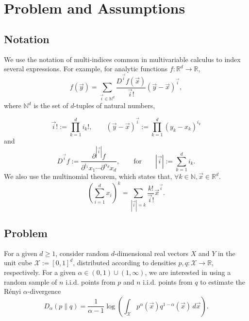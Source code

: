 \documentclass{article}
\newcommand{\N}{\mathbb{N}}                         %
\newcommand{\R}{\mathbb{R}}                         %
\newcommand{\X}{\mathcal{X}}                        %
\newcommand{\vx}{\vec{x}}                           %
\newcommand{\vy}{\vec{y}}                           %
\newcommand{\vi}{{\vec{i}}}                         %
\begin{document}



\section{Problem and Assumptions} \label{sec:Problem}

\subsection{Notation}
We use the notation of multi-indices common in multivariable calculus to index
several expressions. For example, for analytic functions $f : \R^d \to \R$,
\[f(\vy) = \sum_{\vi \in \N^d} \frac{D^\vi f(\vx)}{\vi!} (\vy - \vx)^\vi,\]
where $\N^d$ is the set of $d$-tuples of natural numbers,

\[\vi! := \prod_{k = 1}^d i_k!, \quad \quad
    (\vy - \vx)^\vi := \prod_{k = 1}^d (y_k - x_k)^{i_k}\]
and
\[
    D^\vi f := \frac{\partial^{|\vi|} f}
                   {\partial^{i_1}x_1\cdots\partial^{\alpha_d}x_d}, \quad \quad
    \mbox{for} \quad \quad
    |\vi| := \sum_{k = 1}^d i_k.
\]
We also use the multinomial theorem, which states that,
$\forall k \in \N, \vx \in \R^d$.
\begin{equation}
\label{eq:multinom}
\left( \sum_{i = 1}^d x_i \right)^k
    = \sum_{|\vi| = k} \frac{k!}{\vi!} \vx^\vi.
\end{equation}

\subsection{Problem}
For a given $d \geq 1$, consider random $d$-dimensional real vectors $X$ and
$Y$ in the unit cube $\X := [0,1]^d$, distributed according to densities
$p,q : \X \to \R$, respectively. For a given
$\alpha \in (0,1) \cup (1,\infty)$, we are interested in using a random sample
of $n$ i.i.d. points from $p$ and $n$ i.i.d. points from $q$ to estimate the
R\'enyi $\alpha$-divergence
\[D_\alpha(p\|q)
    = \frac{1}{\alpha - 1}
        \log \left(
          \int_\X
            p^\alpha(\vx)q^{1 - \alpha}(\vx)
          \, d\vx
        \right).
\]
\end{document}
